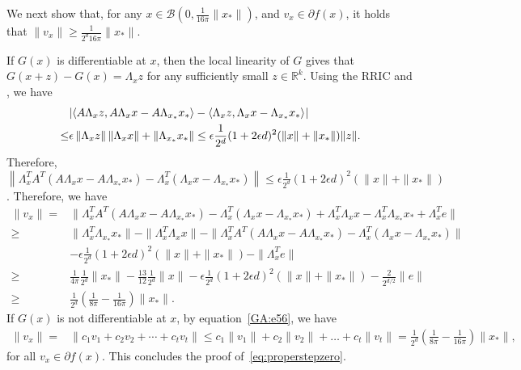 We next show that, for any
$x \in \mathcal{B}(0, \frac{1}{16\pi} \|x_*\|)$, and $v_x \in \partial f(x)$, it holds that $\|{v}_{x}\| \geq \frac{1}{2^d 16\pi} \|x_*\|$.

If $G(x)$ is differentiable at $x$, then
the local linearity of $G$ gives that $G(x + z) - G(x) = \Lambda_{x} z$ for any sufficiently small $z \in \mathbb{R}^k$. Using the RRIC and \cite[(10)]{HV17}, we have
\begin{align*}
&|\langle A \Lambda_{x} z, A \Lambda_{x} x - A \Lambda_{x_*} x_*\rangle - \inner[]{\Lambda_{x} z}{\Lambda_{x} x - \Lambda_{x_*} x_*} | \\
\leq& \epsilon \left\| \Lambda_{x} z \right\| \left\| \Lambda_{x} x \right\| + \left\|\Lambda_{x_*} x_* \right\| \leq \epsilon \frac{1}{2^{d}} (1 + 2 \epsilon d)^2 (\|x\| + \|x_*\|) \|z\|.
\end{align*}
Therefore, $\left\|\Lambda_{x}^T A^T (A\Lambda_{x} x - A\Lambda_{x_*} x_* ) - \Lambda_{x}^T (\Lambda_{x} x - \Lambda_{x_*} x_* )\right\| \leq \epsilon \frac{1}{2^{d}} (1 + 2 \epsilon d)^2 (\|x\| + \|x_*\|)$. Therefore, we have
\begin{align*}
\|{v}_x\| =& \|\Lambda_x^T A^T (A \Lambda_x x -  A \Lambda_{x_*} x_*) - \Lambda_x^T (\Lambda_x x - \Lambda_{x_*} x_*) + \Lambda_x^T \Lambda_x x - \Lambda_x^T \Lambda_{x_*} x_* + \Lambda_x^T e\| \\
\geq& \|\Lambda_x^T \Lambda_{x_*} x_*\| - \|\Lambda_x^T \Lambda_x x\| - \|\Lambda_x^T A^T (A \Lambda_x x -  A \Lambda_{x_*} x_*) - \Lambda_x^T (\Lambda_x x - \Lambda_{x_*} x_*) \| \\
&- \epsilon \frac{1}{2^{d}} (1 + 2 \epsilon d)^2 (\|x\| + \|x_*\|) -
\|\Lambda_x^T e\| \\
\geq&
\frac{1}{4 \pi} \frac{1}{2^d} \|x_*\| - \frac{13}{12}\frac{1}{2^d} \|x\|- \epsilon \frac{1}{2^{d}} (1 + 2 \epsilon d)^2 (\|x\| + \|x_*\|) -\frac{2}{2^{d/2}} \|e\|  %
\\
\geq&
\frac{1}{2^d} \left( \frac{1}{8 \pi} - \frac{1}{16\pi} \right) \|x_*\|.
\end{align*}
If $G(x)$ is not differentiable at $x$, by equation~\eqref{GA:e56}, we have
\begin{align*}
\|v_x\| =& \|c_1 v_1 + c_2 v_2 + \cdots + c_t v_t\| \leq c_1\|v_1\| + c_2\|v_2\| + \ldots + c_t\|v_t\| = \frac{1}{2^d} \left( \frac{1}{8 \pi} - \frac{1}{16\pi} \right) \|x_*\|,
\end{align*}
for all $v_x \in \partial f(x)$.
This concludes the proof of~\eqref{eq:properstepzero}.



